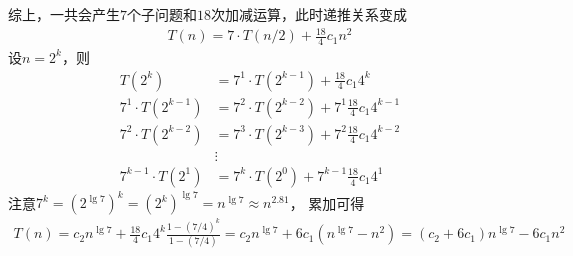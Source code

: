 \documentclass{ctexart}
\begin{document}
综上，一共会产生$7$个子问题和$18$次加减运算，此时递推关系变成
\begin{align*}
    T(n) = 7 \cdot T(n/2) + \frac{18}{4} c_1 n^2
\end{align*}
设$n = 2^k$，则
\begin{align*}
    T(2^k)               & = 7^1 \cdot T(2^{k-1}) + \frac{18}{4} c_1 4^k         \\
    7^1 \cdot T(2^{k-1}) & = 7^2 \cdot T(2^{k-2}) + 7^1 \frac{18}{4} c_1 4^{k-1} \\
    7^2 \cdot T(2^{k-2}) & = 7^3 \cdot T(2^{k-3}) + 7^2 \frac{18}{4} c_1 4^{k-2} \\
                         & \vdots                                                \\
    7^{k-1} \cdot T(2^1) & = 7^k \cdot T(2^0) + 7^{k-1} \frac{18}{4} c_1 4^1
\end{align*}
注意$7^k = (2^{\lg 7})^k = (2^k)^{\lg 7} = n^{\lg 7} \approx n^{2.81}$，
累加可得
\begin{align*}
    T(n) = c_2 n^{\lg 7} + \frac{18}{4} c_1 4^k \frac{1-(7/4)^k}{1-(7/4)} = c_2 n^{\lg 7} + 6 c_1 (n^{\lg 7} - n^2) = \left( c_2 + 6 c_1 \right) n^{\lg 7} - 6 c_1 n^2
\end{align*}
\end{document}
